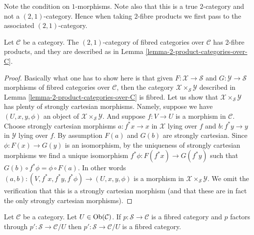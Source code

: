\noindent
Note the condition on $1$-morphisms.
Note also that this is a true $2$-category and
not a $(2, 1)$-category. Hence when taking $2$-fibre
products we first pass to the associated $(2, 1)$-category.

\begin{lemma}
\label{lemma-2-product-fibred-categories-over-C}
Let $\mathcal{C}$ be a category.
The $(2, 1)$-category of fibred categories
over $\mathcal{C}$ has 2-fibre products, and
they are described as in
Lemma \ref{lemma-2-product-categories-over-C}.
\end{lemma}

\begin{proof}
Basically what one has to show here is that given
$F : \mathcal{X} \to \mathcal{S}$ and
$G : \mathcal{Y} \to \mathcal{S}$ morphisms of fibred
categories over $\mathcal{C}$, then the category
$\mathcal{X} \times_\mathcal{S} \mathcal{Y}$
described in Lemma \ref{lemma-2-product-categories-over-C} is fibred.
Let us show that $\mathcal{X} \times_\mathcal{S} \mathcal{Y}$
has plenty of strongly cartesian morphisms.
Namely, suppose we have $(U, x, y, \phi)$ an object of
$\mathcal{X} \times_\mathcal{S} \mathcal{Y}$.
And suppose $f : V \to U$ is a morphism in $\mathcal{C}$.
Choose strongly cartesian morphisms $a : f^*x \to x$ in $\mathcal{X}$
lying over $f$ and $b : f^*y \to y$ in $\mathcal{Y}$ lying over $f$.
By assumption $F(a)$ and $G(b)$ are strongly cartesian.
Since $\phi : F(x) \to G(y)$ is an isomorphism, by the uniqueness
of strongly cartesian morphisms we find a unique isomorphism
$f^*\phi : F(f^*x) \to G(f^*y)$ such that
$G(b) \circ f^*\phi = \phi \circ F(a)$. In other words
$(a, b) : (V, f^*x, f^*y, f^*\phi) \to (U, x, y, \phi)$
is a morphism in $\mathcal{X} \times_\mathcal{S} \mathcal{Y}$.
We omit the verification that this is a strongly cartesian morphism
(and that these are in fact the only strongly cartesian morphisms).
\end{proof}

\begin{lemma}
\label{lemma-cute}
Let $\mathcal{C}$ be a category. Let $U \in \mathop{\mathrm{Ob}}\nolimits(\mathcal{C})$.
If $p : \mathcal{S} \to \mathcal{C}$ is a fibred category
and $p$ factors through $p' : \mathcal{S} \to \mathcal{C}/U$
then $p' : \mathcal{S} \to \mathcal{C}/U$ is a fibred category.
\end{lemma}


